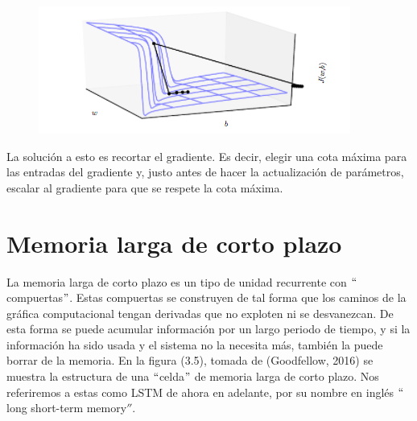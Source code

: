 \begin{figure}[h]
\begin{center}
\includegraphics{./imag/clipping.png}
\end{center}
\caption{}
\end{figure}

La solución a esto es recortar el gradiente. Es decir, elegir una cota máxima para las entradas del gradiente y, justo antes de hacer la actualización de parámetros, escalar al gradiente para que se respete la cota máxima.
\cite{goodfellow-et-al-2016}
\cite{DBLP:journals/corr/Graves13}
\cite{DBLP:journals/corr/abs-1211-5063}

\section{Memoria larga de corto plazo}
La memoria larga de corto plazo es un tipo de unidad recurrente con $``$compuertas$"$. Estas compuertas se construyen de tal forma que los caminos de la gráfica computacional tengan derivadas que no exploten ni se desvanezcan. De esta forma se puede acumular información por un largo periodo de tiempo, y si la información ha sido usada y el sistema no la necesita más, también la puede borrar de la memoria. En la figura (3.5), tomada de (Goodfellow, 2016) se muestra la estructura de una $``$celda$"$ de memoria larga de corto plazo. Nos referiremos a estas como LSTM de ahora en adelante, por su nombre en inglés $``$long short-term memory$''$.
\cite{Gers:2000}
\cite{goodfellow-et-al-2016}
\cite{Hochreiter:1997:LSM:1246443.1246450}

\vspace{1em}

